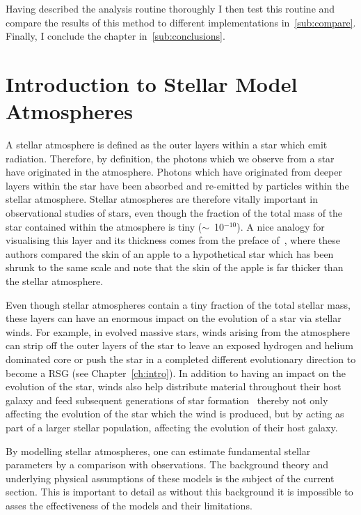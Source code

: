 Having described the analysis routine thoroughly I then test this routine and compare the results of this method to different implementations in~\ref{sub:compare}.
Finally, I conclude the chapter in~\ref{sub:conclusions}.

\section{Introduction to Stellar Model Atmospheres} %
\label{sub:model_atmospheres}

A stellar atmosphere is defined as the outer layers within a star which emit radiation.
Therefore, by definition, the photons which we observe from a star have originated in the atmosphere.
Photons which have originated from deeper layers within the star have been absorbed and re-emitted by particles within the stellar atmosphere.
Stellar atmospheres are therefore vitally important in observational studies of stars, even though the fraction of the total mass of the star contained within the atmosphere is tiny ($\sim$~10$^{-10}$).
A nice analogy for visualising this layer and its thickness comes from the preface of~\cite{1989isa2.book.....B}, where these authors compared the skin of an apple to a hypothetical star which has been shrunk to the same scale and note that the skin of the apple is far thicker than the stellar atmosphere.


Even though stellar atmospheres contain a tiny fraction of the total stellar mass, these layers can have an enormous impact on the evolution of a star via stellar winds.
For example, in evolved massive stars, winds arising from the atmosphere can strip off the outer layers of the star to leave an exposed hydrogen and helium dominated core or push the star in a completed different evolutionary direction to become a RSG (see Chapter~\ref{ch:intro}).
In addition to having an impact on the evolution of the star, winds also help distribute material throughout their host galaxy and feed subsequent generations of star formation~\citep[e.g.][]{2011MNRAS.417..950H,2012MNRAS.421.3522H} thereby not only affecting the evolution of the star which the wind is produced, but by acting as part of a larger stellar population, affecting the evolution of their host galaxy.

By modelling stellar atmospheres, one can estimate fundamental stellar parameters by a comparison with observations.
The background theory and underlying physical assumptions of these models is the subject of the current section.
This is important to detail as without this background it is impossible to asses the effectiveness of the models and their limitations.

